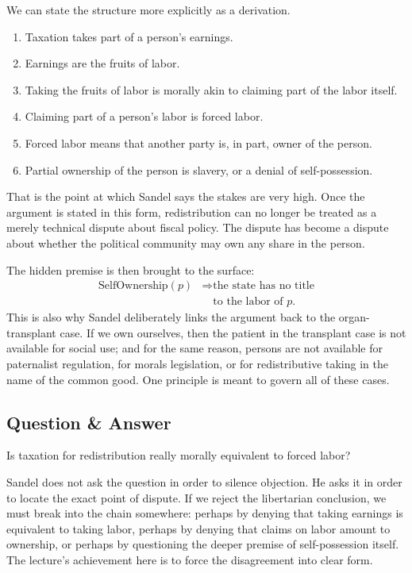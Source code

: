 We can state the structure more explicitly as a derivation.
\begin{enumerate}
\item Taxation takes part of a person's earnings.
\item Earnings are the fruits of labor.
\item Taking the fruits of labor is morally akin to claiming part of the labor itself.
\item Claiming part of a person's labor is forced labor.
\item Forced labor means that another party is, in part, owner of the person.
\item Partial ownership of the person is slavery, or a denial of self-possession.
\end{enumerate}

That is the point at which Sandel says the stakes are very high. Once the argument is stated in this form, redistribution can no longer be treated as a merely technical dispute about fiscal policy. The dispute has become a dispute about whether the political community may own any share in the person.

The hidden premise is then brought to the surface:
\begin{equation}
\begin{aligned}
\text{SelfOwnership}(p)
&\Longrightarrow \text{the state has no title} \\
&\quad \text{to the labor of }p.
\end{aligned}
\end{equation}
This is also why Sandel deliberately links the argument back to the organ-transplant case. If we own ourselves, then the patient in the transplant case is not available for social use; and for the same reason, persons are not available for paternalist regulation, for morals legislation, or for redistributive taking in the name of the common good. One principle is meant to govern all of these cases.

\subsection{Question \& Answer}

Is taxation for redistribution really morally equivalent to forced labor?

Sandel does not ask the question in order to silence objection. He asks it in order to locate the exact point of dispute. If we reject the libertarian conclusion, we must break into the chain somewhere: perhaps by denying that taking earnings is equivalent to taking labor, perhaps by denying that claims on labor amount to ownership, or perhaps by questioning the deeper premise of self-possession itself. The lecture's achievement here is to force the disagreement into clear form.

